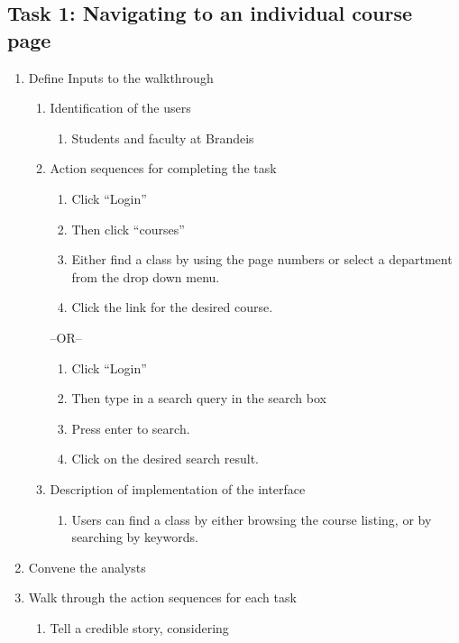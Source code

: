 \documentclass[12pt]{report}
\begin{document}
\subsection{Task 1: Navigating to an individual course page}

\begin{enumerate}
\item Define Inputs to the walkthrough
	\begin{enumerate}
    \item Identification of the users
    	\begin{enumerate}
        \item Students and faculty at Brandeis 
        \end{enumerate}
    \item Action sequences for completing the task
    	\begin{enumerate}
        \item Click ``Login''
        \item Then click ``courses''
       	\item Either find a class by using the page numbers or select a department from the drop down menu.
        \item Click the link for the desired course.
        \end{enumerate}
 --OR-- 
        \begin{enumerate}
        \item Click ``Login''
        \item Then type in a search query in the search box
        \item Press enter to search.
        \item Click on the desired search result. 
        \end{enumerate}
    \item Description of implementation of the interface
        \begin{enumerate}
        \item Users can find a class by either browsing the course listing, or by searching by keywords. 
        \end{enumerate}
	\end{enumerate}
\item Convene the analysts
\item Walk through the action sequences for each task
	\begin{enumerate}
    \item Tell a credible story, considering
    	\begin{enumerate}

\end{enumerate}
\end{enumerate}
\end{enumerate}
\end{document}
